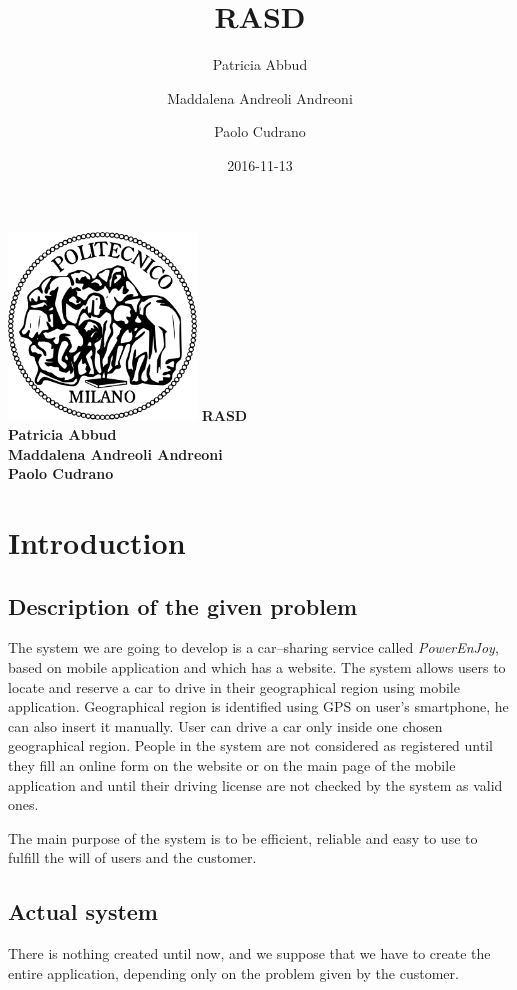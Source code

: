 \documentclass{article}
\title{RASD}
\date{2016-11-13}
\author{
	Patricia Abbud
	\and
	Maddalena Andreoli Andreoni
	\and
	Paolo Cudrano
}
\begin{document}
	\begin{titlepage}
		\centering
		\includegraphics[width=5cm]{img/polimi_logo.png} %
		\vfill
		{\bfseries\Large
			RASD\\
			\vskip4cm
			Patricia Abbud\\
			Maddalena Andreoli Andreoni\\
			Paolo Cudrano\\
		}
		\vfill
		\vfill
	\end{titlepage}

	\tableofcontents
	\newpage

	\section{Introduction}
		\subsection{Description of the given problem}
			The system we are going to develop is a car–sharing service called \textit{PowerEnJoy}, based on mobile application and which has a website. The system allows users to locate and reserve a car to drive in their geographical region using mobile application. Geographical region is identified using GPS on user's smartphone, he can also insert it manually. User can drive a car only inside one chosen geographical region. 
			People in the system are not considered as registered until they fill an online form on the website or on the main page of the mobile application and until their driving license are not checked by the system as valid ones.
			
			The main purpose of the system is to be efficient, reliable and easy to use to fulfill the will of users and the customer.  %
		\subsection{Actual system}
			There is nothing created until now, and we suppose that we have to create the entire application, depending only on the problem given by the customer. 
			
\end{document}
